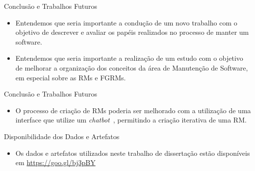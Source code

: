 \documentclass[t,14pt,mathserif]{beamer}
\begin{document}
\begin{frame}{Conclusão e Trabalhos Futuros}
    \begin{itemize}
        \item Entendemos que seria importante a condução de um novo trabalho com
            o objetivo de descrever e avaliar os papéis realizados no processo
            de manter um software.

        \item Entendemos que seria importante a realização de um estudo com o
            objetivo de melhorar a organização dos conceitos da área de
            Manutenção de Software, em especial sobre as RMs e FGRMs.

    \end{itemize}
\end{frame}

\begin{frame}{Conclusão e Trabalhos Futuros}
    \begin{itemize}

        \item O processo de criação de RMs poderia ser melhorado com a
            utilização de uma interface que utilize um
            \textit{chatbot}~\cite{mauldin1994chatterbots,huang2007extracting},
            permitindo a criação iterativa de uma RM\@.

    \end{itemize}
\end{frame}

\begin{frame}{Disponibilidade dos Dados e Artefatos}
    \begin{itemize}

        \item Os dados e artefatos utilizados neste trabalho de dissertação
            estão disponíveis em \url{https://goo.gl/bj3pBY}

    \end{itemize}
\end{frame}
\end{document}
